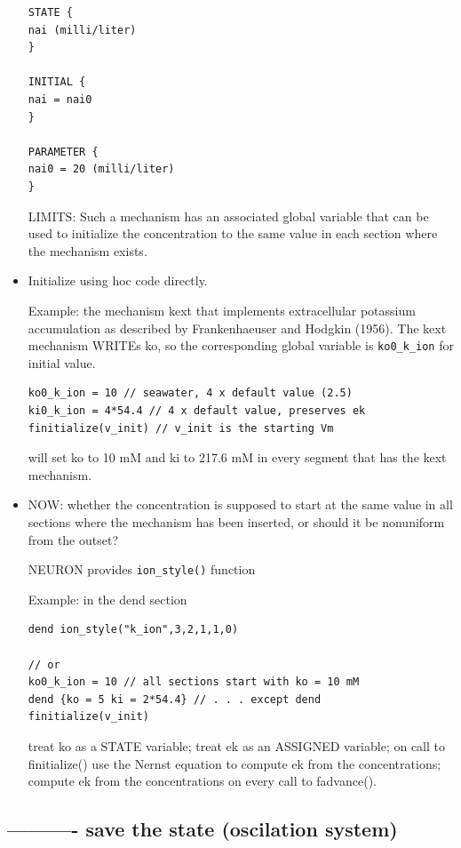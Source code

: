 \begin{itemize}
\begin{verbatim}
STATE {
nai (milli/liter)
}

INITIAL {
nai = nai0
}

PARAMETER {
nai0 = 20 (milli/liter)
}
\end{verbatim} 

LIMITS: Such a mechanism has an associated global variable that can be used to
initialize the concentration to the same value in each section where the
mechanism exists.

   \item Initialize using hoc code directly.

Example: the mechanism kext that implements extracellular potassium accumulation
as described by Frankenhaeuser and Hodgkin (1956). The kext mechanism
WRITEs ko, so the corresponding global variable is \verb!ko0_k_ion! for initial
value.
   
\begin{verbatim}
ko0_k_ion = 10 // seawater, 4 x default value (2.5)
ki0_k_ion = 4*54.4 // 4 x default value, preserves ek
finitialize(v_init) // v_init is the starting Vm
\end{verbatim}
will set ko to 10 mM and ki to 217.6 mM in every segment that has the kext
mechanism.

   
   \item NOW: whether the concentration is supposed to start at the same value
   in all sections where the mechanism has been inserted, or should it be
   nonuniform from the outset?

NEURON provides \verb!ion_style()! function

Example: in the dend section
\begin{verbatim}
dend ion_style("k_ion",3,2,1,1,0)

// or
ko0_k_ion = 10 // all sections start with ko = 10 mM
dend {ko = 5 ki = 2*54.4} // . . . except dend
finitialize(v_init)
\end{verbatim}

treat ko as a STATE variable; treat ek as an ASSIGNED variable;
on call to finitialize() use the Nernst equation to compute ek from
the concentrations; compute ek from the concentrations on every call to
fadvance().


\end{itemize}

\subsection{---------- save the state (oscilation system)}

